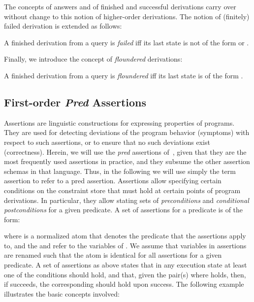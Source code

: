 \documentclass{llncs}
\begin{document}
The concepts of answers and of finished and successful derivations
carry over without change to this notion of higher-order derivations.
The notion of (finitely) failed derivation is extended as follows:
\begin{definition}
  A finished derivation from a query  is \emph{failed} iff
  its last state is not of the form  or
  .
\end{definition}
Finally, we introduce the concept of \emph{floundered} derivations:
\begin{definition}
  A finished derivation from a query  is \emph{floundered}
  iff its last state is of the form 
  .
\end{definition}




\subsection{First-order \emph{Pred} Assertions}
\label{sec:assertions}

Assertions are linguistic constructions for expressing properties of
programs. They are used for detecting deviations of the program
behavior (symptoms) with respect to such assertions, or to ensure
that no such deviations exist (correctness).
Herein,
we will use the \emph{pred} assertions
of~\cite{assert-lang-disciplbook-short},
given that they are the most frequently used assertions in practice,
and they subsume the other assertion schemas in that language.
Thus, in the following we will
use simply the term assertion to refer to a pred assertion.
Assertions allow specifying certain conditions on the
constraint store that must hold at certain points of program
derivations. In particular, they allow stating sets of
\emph{preconditions} and \emph{conditional postconditions} for a
given predicate.
A set of assertions for a predicate is of the form:
\begin{small}
  
\end{small}
where  is a normalized atom that denotes the predicate that the
assertions apply to, and the  and  refer to the
variables of . We assume that variables in assertions are renamed
such that the  atom is identical for all assertions for a given
predicate.  A set of assertions as above states that in any execution
state 
at least one of the  conditions should hold, and that, given
the  pair(s) where  holds, then, if 
succeeds, the corresponding  should hold upon success.
The following example illustrates the basic concepts involved:
\end{document}

